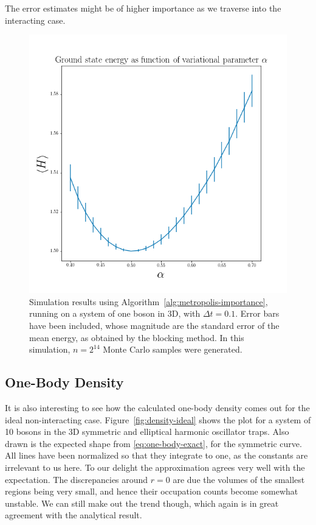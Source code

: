 \documentclass[twocolumn]{article}
\begin{document}
The error estimates might be of higher importance as we traverse into the
interacting case.
\begin{figure}[ht]
    \centering
    \includegraphics[width=0.8\linewidth]{../results/error-plot-3D-2-pow-14.png}
    \caption{Simulation results using Algorithm~\ref{alg:metropolis-importance},
    running on a system of one boson in 3D, with $\Delta t=0.1$. Error bars have
    been included, whose
    magnitude are the standard error of the mean energy, as obtained by the
    blocking method. In this simulation, $n=2^{14}$ Monte Carlo samples were
    generated.}
    \label{fig:errorbar}
\end{figure}

\subsection{One-Body Density}

It is also interesting to see how the calculated one-body density comes out for
the ideal non-interacting case. Figure~\ref{fig:density-ideal} shows the plot
for a system of 10 bosons in the 3D symmetric and elliptical harmonic oscillator
traps. Also drawn is the expected shape from \eqref{eq:one-body-exact}, for the
symmetric curve. All lines have been normalized so that they integrate to one,
as the constants are irrelevant to us here. To our delight the approximation
agrees very well with the expectation. The discrepancies around $r=0$ are due
the volumes of the smallest regions being very small, and hence their occupation
counts become somewhat unstable. We can still make out the trend though, which
again is in great agreement with the analytical result.
\end{document}
